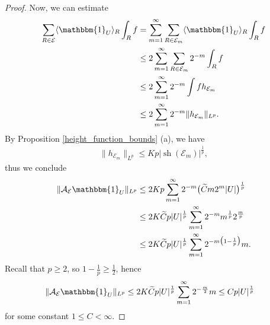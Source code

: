 \documentclass[oneside]{amsart}
\theoremstyle{definition}
\theoremstyle{plain}
\numberwithin{equation}{section}
\numberwithin{theorem}{section}
\newcommand{\sh}{\operatorname{sh}}
\newcommand{\ind}{\mathbbm{1}}
\begin{document}
\begin{proof}
  Now, we can estimate
  \begin{align*}
    \sum_{R \in \mathcal{E}} \langle \ind_U \rangle_R \int_R f
    &= \sum_{m=1}^\infty \sum_{R \in \mathcal{E}_m}
      \langle \ind_U \rangle_R \int_R f \\
    &\leq 2\sum_{m=1}^\infty \sum_{R \in \mathcal{E}_m} 2^{-m} \int_R f \\
    &\leq 2 \sum_{m=1}^\infty 2^{-m} \int f h_{\mathcal{E}_m} \\
    &\leq 2 \sum_{m=1}^\infty 2^{-m} \|h_{\mathcal{E}_m}\|_{L^p}.
  \end{align*}
  By Proposition \ref{height_function_bounds} (a), we have
  \begin{align*}
    \|h_{\mathcal{E}_m}\|_{L^p} \leq K p|\sh(\mathcal{E}_m)|^{\frac{1}{p}},
  \end{align*}
  thus we conclude
  \begin{align*}
    \|\mathcal{A}_{\mathcal{E}} \ind_U\|_{L^p} &\leq 2 K p \sum_{m=1}^\infty
    2^{-m} \big( \widetilde{C} m2^m|U| \big)^{\frac{1}{p}} \\
    &\leq 2 K \widetilde{C} p |U|^{\frac{1}{p}}
      \sum_{m=1}^\infty 2^{-m} m^{\frac{1}{p}} 2^{\frac{m}{p}} \\
    &\leq 2 K \widetilde{C} p |U|^{\frac{1}{p}}
      \sum_{m=1}^\infty 2^{-m\big(1-\frac{1}{p}\big)} m.
  \end{align*}
  Recall that $p \geq 2$, so $1 - \frac{1}{p} \geq \frac{1}{2}$, hence
  \begin{align*}
    \|\mathcal{A}_{\mathcal{E}} \ind_U\|_{L^p}
    &\leq 2 K \widetilde{C} p |U|^{\frac{1}{p}}
    \sum_{m=1}^\infty 2^{-\frac{m}{2}} m
    \leq C p|U|^{\frac{1}{p}}
  \end{align*}
  for some constant $1 \leq C < \infty$.
\end{proof}
\end{document}
